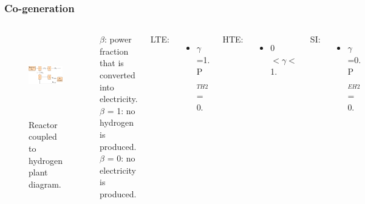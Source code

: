 \begin{frame}
\frametitle{Co-generation}
\begin{columns}
    \column[t]{6.5cm}
   	\begin{figure}[htbp!]
		\begin{center}
			\includegraphics[height=3.6cm]{images/hte-figure0.png}
		\end{center}
		\caption{Reactor coupled to hydrogen plant diagram.}
 	\end{figure}

 	\column[t]{3.5cm}
 	$\beta$: power fraction that is converted into electricity.
 	\\
    $\beta$ = 1: no hydrogen is produced.
    \\
 	$\beta$ = 0: no electricity is produced. \vspace{0.6cm}

 	LTE:
 	\begin{itemize}
 		\item $\gamma$=1. P$_{TH2}$ = 0.
 	\end{itemize}

 	HTE:
 	\begin{itemize}
 		\item 0 $< \gamma <$ 1.
 	\end{itemize}

    SI:
 	\begin{itemize}
 		\item $\gamma$=0. P$_{EH2}$ = 0.
 	\end{itemize}


\end{columns}
\end{frame}